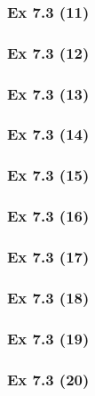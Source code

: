 \newpage		%

\subsubsection{Ex 7.3 (11)}\label{sec:Ex_7.3.11}

\subsubsection{Ex 7.3 (12)}\label{sec:Ex_7.3.12}

\subsubsection{Ex 7.3 (13)}\label{sec:Ex_7.3.13}

\subsubsection{Ex 7.3 (14)}\label{sec:Ex_7.3.14}

\subsubsection{Ex 7.3 (15)}\label{sec:Ex_7.3.15}

\subsubsection{Ex 7.3 (16)}\label{sec:Ex_7.3.16}

\subsubsection{Ex 7.3 (17)}\label{sec:Ex_7.3.17}

\subsubsection{Ex 7.3 (18)}\label{sec:Ex_7.3.18}

\subsubsection{Ex 7.3 (19)}\label{sec:Ex_7.3.19}

\subsubsection{Ex 7.3 (20)}\label{sec:Ex_7.3.20}

